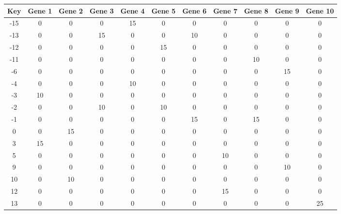 \begin{tabular}{|c|c|c|c|c|c|c|c|c|c|c|}
\hline
Key & Gene 1 & Gene 2 & Gene 3 & Gene 4 & Gene 5 & Gene 6 & Gene 7 & Gene 8 & Gene 9 & Gene 10 \\
\hline
-15 & 0 & 0 & 0 & 15 & 0 & 0 & 0 & 0 & 0 & 0 \\
-13 & 0 & 0 & 15 & 0 & 0 & 10 & 0 & 0 & 0 & 0 \\
-12 & 0 & 0 & 0 & 0 & 15 & 0 & 0 & 0 & 0 & 0 \\
-11 & 0 & 0 & 0 & 0 & 0 & 0 & 0 & 10 & 0 & 0 \\
-6 & 0 & 0 & 0 & 0 & 0 & 0 & 0 & 0 & 15 & 0 \\
-4 & 0 & 0 & 0 & 10 & 0 & 0 & 0 & 0 & 0 & 0 \\
-3 & 10 & 0 & 0 & 0 & 0 & 0 & 0 & 0 & 0 & 0 \\
-2 & 0 & 0 & 10 & 0 & 10 & 0 & 0 & 0 & 0 & 0 \\
-1 & 0 & 0 & 0 & 0 & 0 & 15 & 0 & 15 & 0 & 0 \\
0 & 0 & 15 & 0 & 0 & 0 & 0 & 0 & 0 & 0 & 0 \\
3 & 15 & 0 & 0 & 0 & 0 & 0 & 0 & 0 & 0 & 0 \\
5 & 0 & 0 & 0 & 0 & 0 & 0 & 10 & 0 & 0 & 0 \\
9 & 0 & 0 & 0 & 0 & 0 & 0 & 0 & 0 & 10 & 0 \\
10 & 0 & 10 & 0 & 0 & 0 & 0 & 0 & 0 & 0 & 0 \\
12 & 0 & 0 & 0 & 0 & 0 & 0 & 15 & 0 & 0 & 0 \\
13 & 0 & 0 & 0 & 0 & 0 & 0 & 0 & 0 & 0 & 25 \\
\hline
\end{tabular}